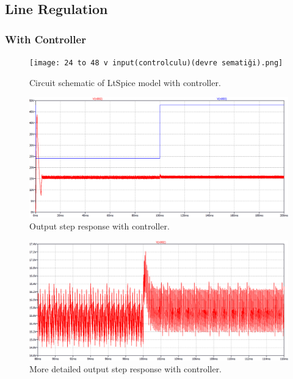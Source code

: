 \documentclass{article}
\begin{document}
\subsection{Line Regulation}


\subsubsection{With Controller}

\begin{figure}[H]
    \centering
    \texttt{[image: 24 to 48 v input(controlculu)(devre sematiği).png]}
    \caption{Circuit schematic of LtSpice model with controller.}
    \label{fig:my_label}
\end{figure}


\begin{figure}[H]
    \centering
    \includegraphics[scale=0.4]{24 to 48 v input(controlculu)(output voltage step response).png}
    \caption{Output step response with controller.}
    \label{fig:my_label}
\end{figure}

\begin{figure}[H]
    \centering
    \includegraphics[scale=0.4]{24 to 48 v input(controlculu)(output voltage line regulation belli).png}
    \caption{More detailed output step response with controller.}
    \label{fig:my_label}
\end{figure}
\end{document}
